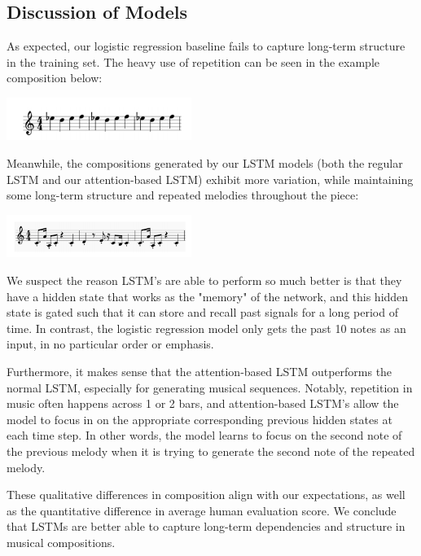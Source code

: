 \documentclass[twoside,twocolumn]{article}
\begin{document}
\subsection{Discussion of Models}

As expected, our logistic regression baseline fails to capture long-term
structure in the training set. The heavy use of repetition can be seen in the example composition below:

\includegraphics[width = 0.45\textwidth]{images/logreg_composition.png}

Meanwhile, the compositions generated by our LSTM models (both the regular LSTM and our attention-based LSTM) exhibit more
variation, while maintaining some long-term structure and repeated
melodies throughout the piece:

\includegraphics[width = 0.45\textwidth]{images/magenta_composition.png}

We suspect the reason LSTM's are able to perform so much better is that they have a hidden state that works as the "memory" of the network, and this hidden state is gated such that it can store and recall past signals for a long period of time. In contrast, the logistic regression model only gets the past 10 notes as an input, in no particular order or emphasis.

Furthermore, it makes sense that the attention-based LSTM outperforms the normal LSTM, especially for generating musical sequences. Notably, repetition in music often happens across 1 or 2 bars, and attention-based LSTM's allow the model to focus in on the appropriate corresponding previous hidden states at each time step. In other words, the model learns to focus on the second note of the previous melody when it is trying to generate the second note of the repeated melody. 

These qualitative differences in composition align with our expectations, as well as the quantitative difference in average human
evaluation score. We conclude that LSTMs are better able to capture long-term dependencies and structure in musical compositions.


\end{document}
